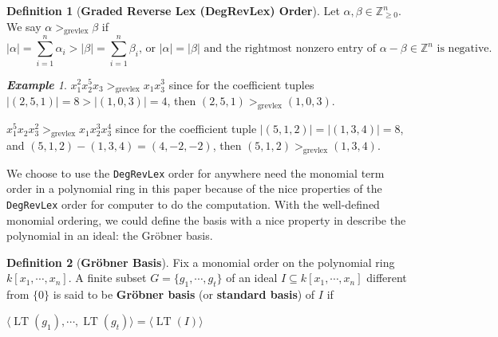 \documentclass{article}
\newtheorem{theorem}{Theorem}[section]
\newcommand{\lt}{\ensuremath{\operatorname{LT}}}
\newcommand{\grevlex}{\ensuremath{\operatorname{grevlex}}}
\theoremstyle{definition}
\newtheorem{definition}{Definition}[section]
\theoremstyle{remark}
\theoremstyle{example}
\newtheorem{example}{\textbf{Example}}[section]
\begin{document}
\begin{definition}[\textbf{Graded Reverse Lex (DegRevLex) Order}]
    Let $\alpha,\beta \in \mathbb{Z}_{\geq 0}^{n}$. We say $\alpha >_{\grevlex} \beta$ if 
    \begin{equation}
        \lvert \alpha \rvert = \sum_{i = 1}^{n}{\alpha_i} > \lvert \beta \rvert = \sum_{i = 1}^{n}{\beta_i} \text{, or } \lvert \alpha \rvert = \lvert \beta \rvert \text{ and the rightmost nonzero entry of } \alpha  - \beta \in \mathbb{Z}^n \text{ is negative.}
    \end{equation}
\end{definition}

\begin{example}
    $x_{1}^2x_{2}^{5}x_{3} >_{\grevlex} x_{1}x_3^{3}$ since for the coefficient tuples $\lvert (2,5,1) \rvert = 8 > \lvert (1,0,3) \rvert = 4$, then $(2,5,1) >_{\grevlex} (1,0,3)$. 
    
    $x_1^5x_2x_3^2 >_{\grevlex} x_1x_2^{3}x_3^4$ since for the coefficient tuple $\lvert (5,1,2) \rvert = \lvert (1,3,4) \rvert = 8$, and $(5,1,2) - (1,3,4) = (4,-2,-2)$, then $(5,1,2) >_{\grevlex} (1,3,4)$.
\end{example}

We choose to use the \verb+DegRevLex+ order for anywhere need the monomial term order in a polynomial ring in this paper because of the nice properties of the \verb+DegRevLex+ order for computer to do the computation. With the well-defined monomial ordering, we could define the basis with a nice property in describe the polynomial in an ideal: the Gröbner basis.

\begin{definition}[\textbf{Gröbner Basis}]\cite{cox_grobner_2015}\label{def:gb}
    Fix a monomial order on the polynomial ring $k[x_1, \cdots, x_n]$. A finite subset $G = \{g_1, \cdots, g_t\}$ of an ideal $I \subseteq k[x_1, \cdots, x_n]$ different from $\{0\}$ is said to be \textbf{Gröbner basis} (or \textbf{standard basis}) of $I$ if
    \begin{center}
        $\langle \lt(g_1), \cdots, \lt(g_t)\rangle = \langle \lt(I) \rangle$
    \end{center}
\end{definition}

\end{document}
